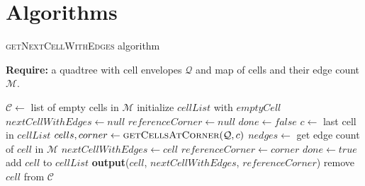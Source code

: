     \section*{Algorithms}
    \begin{algorithm} \caption{\textsc{getNextCellWithEdges} algorithm}
        \textbf{Require:} a quadtree with cell envelopes $\mathcal Q$ and map of cells and their edge count $\mathcal M$.
        \begin{algorithmic}[1]
            \State $\mathcal C \gets $ list of empty cells in $\mathcal M$
                \State initialize $cellList$ with $emptyCell$ 
                \State $nextCellWithEdges \gets null$
                \State $referenceCorner \gets null$
                \State $done \gets false$
                    \State $c \gets $ last cell in $cellList$ 
                    \State $cells, corner \gets \textsc{getCellsAtCorner}(\mathcal Q, c)$ 
                        \State $nedges \gets$ get edge count of $cell$ in $\mathcal M$ 
                            \State $nextCellWithEdges \gets cell$
                            \State $referenceCorner \gets corner$
                            \State $done \gets true$
                        \Else
                            \State add $cell$ to $cellList$
                        \EndIf
                    \EndFor
                \EndWhile
                    \State \textbf{output}($cell$, $nextCellWithEdges$, $referenceCorner$)
                    \State remove $cell$ from $\mathcal C$
                \EndFor
            \EndFor
        \EndFunction
        \end{algorithmic}
    \end{algorithm}
    

